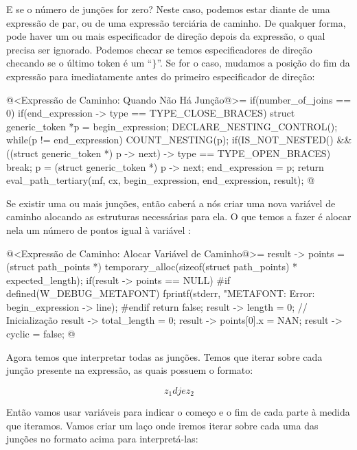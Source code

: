 E se o número de junções for zero? Neste caso, podemos estar diante de
uma expressão de par, ou de uma expressão terciária de caminho. De
qualquer forma, pode haver um ou mais especificador de direção depois
da expressão, o qual precisa ser ignorado. Podemos checar se temos
especificadores de direção checando se o último token é um
``$\}$''. Se for o caso, mudamos a posição do fim da expressão para
imediatamente antes do primeiro especificador de direção:

\iniciocodigo
@<Expressão de Caminho: Quando Não Há Junção@>=
if(number_of_joins == 0){
  if(end_expression -> type == TYPE_CLOSE_BRACES){
    struct generic_token *p = begin_expression;
    DECLARE_NESTING_CONTROL();
    while(p != end_expression){
      COUNT_NESTING(p);
      if(IS_NOT_NESTED() &&
         ((struct generic_token *) p -> next) -> type == TYPE_OPEN_BRACES)
        break;
      p = (struct generic_token *) p -> next;
    }
    end_expression = p;
  }
  return eval_path_tertiary(mf, cx, begin_expression, end_expression,
                            result);
}
@
\fimcodigo

Se existir uma ou mais junções, então caberá a nós criar uma nova
variável de caminho alocando as estruturas necessárias para ela. O que
temos a fazer é alocar nela um número de pontos igual à
variável :

\iniciocodigo
@<Expressão de Caminho: Alocar Variável de Caminho@>=
result -> points = (struct path_points *)
                     temporary_alloc(sizeof(struct path_points) *
                     expected_length);
if(result -> points == NULL){
#if defined(W_DEBUG_METAFONT)
  fprintf(stderr, "METAFONT: Error: %
          begin_expression -> line);
#endif
    return false;
}
result -> length = 0; // Inicialização
result -> total_length = 0;
result -> points[0].x = NAN;
result -> cyclic = false;
@
\fimcodigo

Agora temos que interpretar todas as junções. Temos que iterar sobre
cada junção presente na expressão, as quais possuem o formato:

$$
z_1{d} j {e}z_2
$$

Então vamos usar variáveis para indicar o começo e o fim de cada parte
à medida que iteramos. Vamos criar um laço onde iremos iterar sobre
cada uma das junções no formato acima para interpretá-las:

